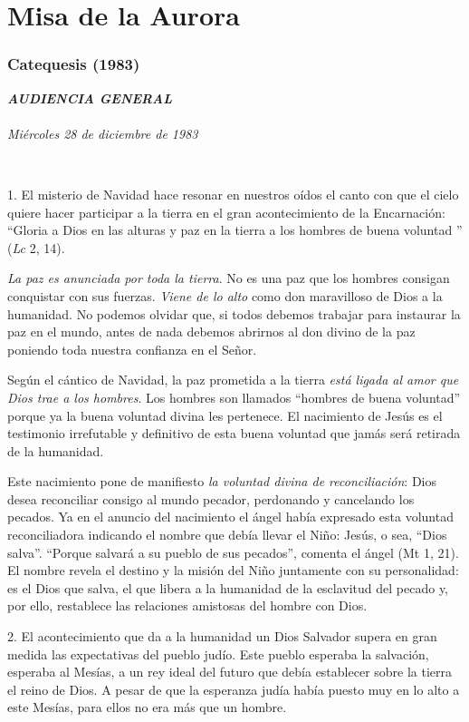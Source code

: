 \section{Misa de la Aurora}
\subsubsection{Catequesis (1983)}
\textbf{\emph{AUDIENCIA GENERAL\\
}}\\
\emph{Miércoles 28 de diciembre de 1983}

~

1. El misterio de Navidad hace resonar en nuestros oídos el canto con
que el cielo quiere hacer participar a la tierra en el gran
acontecimiento de la Encarnación: ``Gloria a Dios en las alturas y paz
en la tierra a los hombres de buena voluntad '' (\emph{Lc} 2, 14).

\emph{La paz es anunciada por toda la tierra}. No es una paz que los
hombres consigan conquistar con sus fuerzas. \emph{Viene de lo alto}
como don maravilloso de Dios a la humanidad. No podemos olvidar que, si
todos debemos trabajar para instaurar la paz en el mundo, antes de nada
debemos abrirnos al don divino de la paz poniendo toda nuestra confianza
en el Señor.

Según el cántico de Navidad, la paz prometida a la tierra \emph{está
	ligada al amor que Dios trae a los hombres}. Los hombres son llamados
``hombres de buena voluntad'' porque ya la buena voluntad divina les
pertenece. El nacimiento de Jesús es el testimonio irrefutable y
definitivo de esta buena voluntad que jamás será retirada de la
humanidad.

Este nacimiento pone de manifiesto \emph{la voluntad divina de
	reconciliación}: Dios desea reconciliar consigo al mundo pecador,
perdonando y cancelando los pecados. Ya en el anuncio del nacimiento el
ángel había expresado esta voluntad reconciliadora indicando el nombre
que debía llevar el Niño: Jesús, o sea, ``Dios salva''. ``Porque salvará
a su pueblo de sus pecados'', comenta el ángel (Mt 1, 21). El nombre
revela el destino y la misión del Niño juntamente con su personalidad:
es el Dios que salva, el que libera a la humanidad de la esclavitud del
pecado y, por ello, restablece las relaciones amistosas del hombre con
Dios.

2. El acontecimiento que da a la humanidad un Dios Salvador supera en
gran medida las expectativas del pueblo judío. Este pueblo esperaba la
salvación, esperaba al Mesías, a un rey ideal del futuro que debía
establecer sobre la tierra el reino de Dios. A pesar de que la esperanza
judía había puesto muy en lo alto a este Mesías, para ellos no era más
que un hombre.

